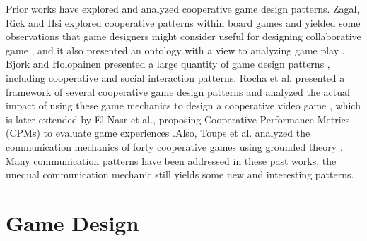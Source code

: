 \documentclass{sigchi}
\begin{document}
Prior works have explored and analyzed cooperative game design patterns. Zagal, Rick and Hsi explored cooperative patterns within board games and yielded some observations that game designers might consider useful for designing collaborative game \cite{CG1}, and it also presented an ontology with a view to analyzing game play \cite{CG3}. 
Bjork and Holopainen presented a large quantity of game design patterns \cite{CG2}, including cooperative and social interaction patterns.
Rocha et al. presented a framework of several cooperative game design patterns and analyzed the actual impact of using these game mechanics to design a cooperative video game \cite{CG4}, which is later extended by
El-Nasr et al., proposing Cooperative Performance Metrics (CPMs) to evaluate game experiences \cite{CPMs}.Also, Toups et al. analyzed the communication mechanics of forty cooperative games using grounded theory \cite{CG5}. Many communication patterns have been addressed in these past works, the unequal communication mechanic still yields some new and interesting patterns.

\section{Game Design}


\end{document}

